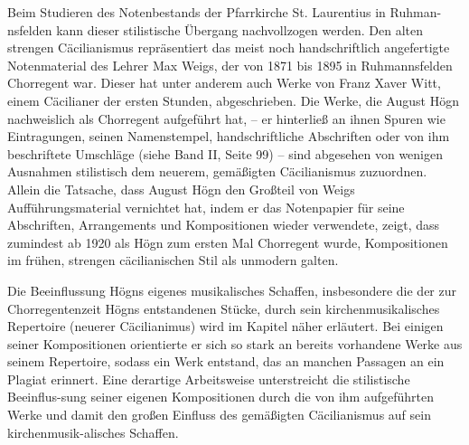 Beim Studieren des Notenbestands der Pfarrkirche St. Laurentius in
Ruhman-nsfelden kann dieser stilistische Übergang nachvollzogen werden.
Den alten strengen Cäcilianismus repräsentiert das meist noch
handschriftlich angefertigte Notenmaterial des Lehrer Max Weigs, der
von 1871 bis 1895 in Ruhmannsfelden Chorregent war. Dieser hat unter
anderem auch Werke von Franz Xaver Witt, einem Cäcilianer der ersten
Stunden, abgeschrieben. Die Werke, die August Högn nachweislich als
Chorregent aufgeführt hat, – er hinterließ an ihnen Spuren wie
Eintragungen, seinen Namenstempel, handschriftliche Abschriften oder
von ihm beschriftete Umschläge (siehe Band II, Seite 99) – sind
abgesehen von wenigen Ausnahmen stilistisch dem neuerem, gemäßigten
Cäcilianismus zuzuordnen. Allein die Tatsache, dass August Högn den
Großteil von Weigs Aufführungsmaterial vernichtet hat, indem er das
Notenpapier für seine Abschriften, Arrangements und Kompositionen
wieder verwendete, zeigt, dass zumindest ab 1920 als Högn zum ersten
Mal Chorregent wurde, Kompositionen im frühen, strengen cäcilianischen
Stil als unmodern galten.

Die Beeinflussung Högns eigenes musikalisches Schaffen, insbesondere die
der zur Chorregentenzeit Högns entstandenen Stücke, durch sein
kirchenmusikalisches Repertoire (neuerer Cäcilianimus) wird im Kapitel
 näher erläutert. Bei einigen seiner Kompositionen
orientierte er sich so stark an bereits vorhandene Werke aus seinem
Repertoire, sodass ein Werk entstand, das an manchen Passagen an ein
Plagiat erinnert. Eine derartige Arbeitsweise unterstreicht die
stilistische Beeinflus-sung seiner eigenen Kompositionen durch die von
ihm aufgeführten Werke und damit den großen Einfluss des gemäßigten
Cäcilianismus auf sein kirchenmusik-alisches Schaffen.